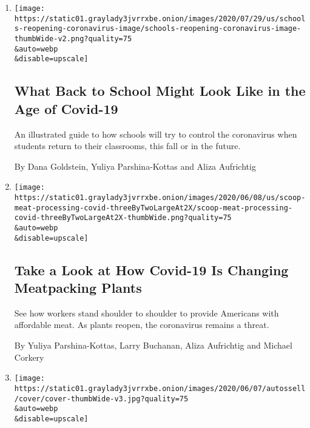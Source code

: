\begin{enumerate}
\def\labelenumi{\arabic{enumi}.}
\item
  \href{/interactive/2020/07/29/us/schools-reopening-coronavirus.html}{}

  \texttt{[image: https://static01.graylady3jvrrxbe.onion/images/2020/07/29/us/schools-reopening-coronavirus-image/schools-reopening-coronavirus-image-thumbWide-v2.png?quality=75\\\&auto=webp\\\&disable=upscale]}

  \hypertarget{what-back-to-school-might-look-like-in-the-age-of-covid-19}{%
  \subsection{What Back to School Might Look Like in the Age of
  Covid-19}\label{what-back-to-school-might-look-like-in-the-age-of-covid-19}}

  An illustrated guide to how schools will try to control the
  coronavirus when students return to their classrooms, this fall or in
  the future.

  By Dana Goldstein, Yuliya Parshina-Kottas and Aliza Aufrichtig
\item
  \href{/interactive/2020/06/08/us/meat-processing-plants-coronavirus.html}{}

  \texttt{[image: https://static01.graylady3jvrrxbe.onion/images/2020/06/08/us/scoop-meat-processing-covid-threeByTwoLargeAt2X/scoop-meat-processing-covid-threeByTwoLargeAt2X-thumbWide.png?quality=75\\\&auto=webp\\\&disable=upscale]}

  \hypertarget{take-a-look-at-how-covid-19-is-changing-meatpacking-plants}{%
  \subsection{Take a Look at How Covid-19 Is Changing Meatpacking
  Plants}\label{take-a-look-at-how-covid-19-is-changing-meatpacking-plants}}

  See how workers stand shoulder to shoulder to provide Americans with
  affordable meat. As plants reopen, the coronavirus remains a threat.

  By Yuliya Parshina-Kottas, Larry Buchanan, Aliza Aufrichtig and
  Michael Corkery
\item
  \href{/interactive/2020/06/07/us/george-floyd-protest-aerial-photos.html}{}

  \texttt{[image: https://static01.graylady3jvrrxbe.onion/images/2020/06/07/autossell/cover/cover-thumbWide-v3.jpg?quality=75\\\&auto=webp\\\&disable=upscale]}


\end{enumerate}
